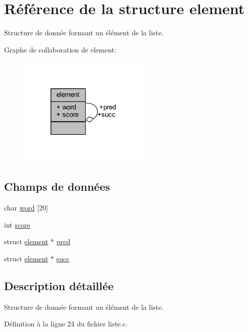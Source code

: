 \hypertarget{structelement}{}\section{Référence de la structure element}
\label{structelement}


Structure de donnée formant un élément de la liste.  




Graphe de collaboration de element\+:
\nopagebreak
\begin{figure}[H]
\begin{center}
\leavevmode
\includegraphics[width=177pt]{da/d80/structelement__coll__graph}
\end{center}
\end{figure}
\subsection*{Champs de données}
\begin{DoxyCompactItemize}
\item 
char \hyperlink{structelement_af034065dfe33f7ef74362e100b14b260}{word} \mbox{[}20\mbox{]}
\item 
int \hyperlink{structelement_aef160b7437d94056f1dc59646cd5b87d}{score}
\item 
struct \hyperlink{structelement}{element} $\ast$ \hyperlink{structelement_a932b74e6abe994b7316f4347a70d215b}{pred}
\item 
struct \hyperlink{structelement}{element} $\ast$ \hyperlink{structelement_a28a298bdc8522e913d39bf3f672ff5e5}{succ}
\end{DoxyCompactItemize}


\subsection{Description détaillée}
Structure de donnée formant un élément de la liste. 

Définition à la ligne 24 du fichier liste.\+c.




